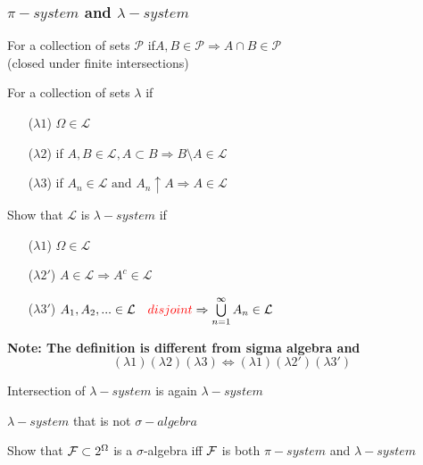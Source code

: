\subsubsection*{$\pi-system$ and $\lambda-system$}
\begin{dfn}[$\pi-system$] For a collection of sets $\mathcal{P}$ if$A, B\in \mathcal{P} \Rightarrow A\cap B \in \mathcal{P}$ \\
(closed under finite intersections)
\end{dfn}
\begin{dfn}For a collection of sets $\lambda$ if
\begin{enumerate}
    \item[($\lambda1$)] $\Omega \in \mathcal{L}$
    \item[($\lambda2$)] if $A,B\in \mathcal{L}, A\subset B \Rightarrow B\setminus A\in \mathcal{L}$
    \item[($\lambda3$)] if $A_n \in \mathcal{L} \text{ and } A_n \uparrow A \Rightarrow A\in \mathcal{L}$ 
\end{enumerate}
\end{dfn}
\begin{ex}
Show that $\mathcal{L}$ is $\lambda-system$ if
\begin{enumerate}
    \item[($\lambda1$)] $\Omega \in \mathcal{L}$
    \item[($\lambda2'$)] $A\in \mathcal{L} \Rightarrow A^c \in \mathcal{L}$
    \item[($\lambda3'$)] $A_1, A_2, ... \in \mathcal{L} \quad \textcolor{red}{disjoint } \Rightarrow \bigcup\limits_{n=1}^\infty A_n \in \mathcal{L}$
\end{enumerate}
\end{ex} \textbf{Note: The definition is different from sigma algebra and}
\begin{equation*}
    (\lambda1)(\lambda2)(\lambda3) \Longleftrightarrow (\lambda1)(\lambda2')(\lambda3')
\end{equation*}
\begin{ex}
Intersection of $\lambda-system$ is again $\lambda-system$
\end{ex}
\begin{ex}$\lambda-system$ that is not $\sigma-algebra$
\end{ex}
\begin{ex}
Show that $\mathcal{F} \subset 2^{\Omega}$ is a $\sigma$-algebra iff $\mathcal{F}$ is both $\pi-system$ and $\lambda-system$
\end{ex}
